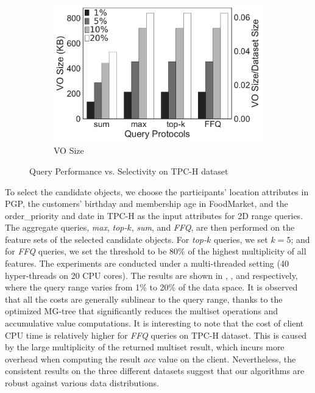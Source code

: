 \begin{figure}[t]
\begin{subfigure}[b]{.36\linewidth}
    \includegraphics[width=\linewidth]{exp-figs/aggregate-queries/tpch_vo.pdf}
    \caption{VO Size}
  \end{subfigure}
  \caption{Query Performance vs. Selectivity on TPC-H dataset}\label{fig:aggregate-queries:tpch}
\end{figure}

To select the candidate objects, we choose the participants' location attributes in PGP, the customers' birthday and membership age in FoodMarket, and the order\_priority and date in TPC-H as the input attributes for 2D range queries. The aggregate queries, \emph{max}, \emph{top-$k$}, \emph{sum}, and \emph{FFQ}, are then performed on the feature sets of the selected candidate objects. For \emph{top-$k$} queries, we set $k=5$; and for \emph{FFQ} queries, we set the threshold to be 80\% of the highest multiplicity of all features. The experiments are conducted under a multi-threaded setting (40 hyper-threads on 20 CPU cores). The results are shown in , , and  respectively, where the query range varies from 1\% to 20\% of the data space. It is observed that all the costs are generally sublinear to the query range, thanks to the optimized MG-tree that significantly reduces the multiset operations and accumulative value computations.
It is interesting to note that the cost of client CPU time is relatively higher for \emph{FFQ} queries on TPC-H dataset. This is caused by the large multiplicity of the returned multiset result, which incurs more overhead when computing the result $acc$ value on the client.
Nevertheless, the consistent results on the three different datasets suggest that our algorithms are robust against various data distributions.

